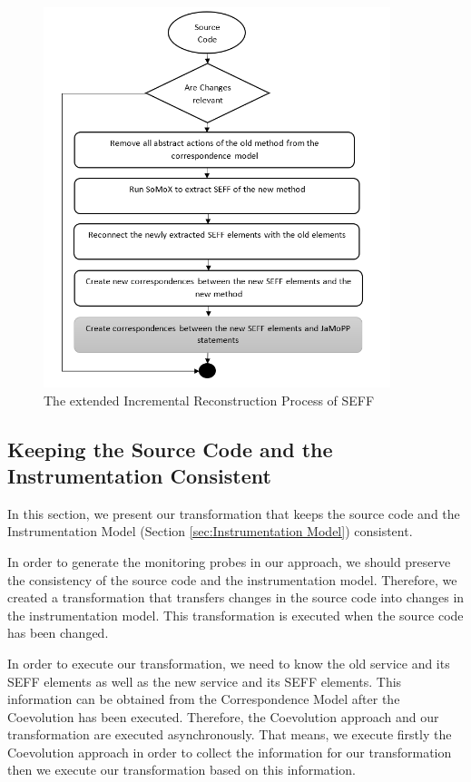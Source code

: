 \begin{figure}[h]
\centering
\includegraphics[width=0.9\textwidth]{figures/seff_reconst_extension}
\caption{The extended Incremental Reconstruction Process of SEFF}
\label{fig:seff_reconst_extension}
\end{figure}


\subsection{Keeping the Source Code and the Instrumentation Consistent}
\label{sec:Keeping the Source Code and the Instrumentation Consistent}
In this section, we present our transformation that keeps the source code and the Instrumentation Model (Section \ref{sec:Instrumentation Model}) consistent.

In order to generate the monitoring probes in our approach, we should preserve the consistency of the source code and the instrumentation model. Therefore, we created a transformation that transfers changes in the source code into changes in the instrumentation model. This transformation is executed when the source code has been changed.

In order to execute our transformation, we need to know the old service and its SEFF elements as well as the new service and its SEFF elements. This information can be obtained from the Correspondence Model after the Coevolution has been executed. Therefore, the Coevolution approach and our transformation are executed asynchronously. That means, we execute firstly the Coevolution approach in order to collect the information for our transformation then we execute our transformation based on this information.

